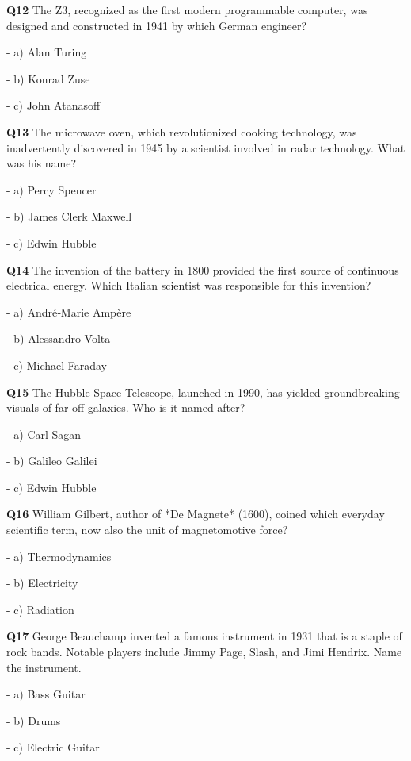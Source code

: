\textbf{Q12} The Z3, recognized as the first modern programmable computer, was designed and constructed in 1941 by which German engineer?\par
\quad - a) Alan Turing\par
\quad - b) Konrad Zuse\par
\quad - c) John Atanasoff\par

\textbf{Q13} The microwave oven, which revolutionized cooking technology, was inadvertently discovered in 1945 by a scientist involved in radar technology. What was his name?\par
\quad - a) Percy Spencer\par
\quad - b) James Clerk Maxwell\par
\quad - c) Edwin Hubble\par

\textbf{Q14} The invention of the battery in 1800 provided the first source of continuous electrical energy. Which Italian scientist was responsible for this invention?\par
\quad - a) André‑Marie Ampère\par
\quad - b) Alessandro Volta\par
\quad - c) Michael Faraday\par

\textbf{Q15} The Hubble Space Telescope, launched in 1990, has yielded groundbreaking visuals of far‑off galaxies. Who is it named after?\par
\quad - a) Carl Sagan\par
\quad - b) Galileo Galilei\par
\quad - c) Edwin Hubble\par

\textbf{Q16} William Gilbert, author of *De Magnete* (1600), coined which everyday scientific term, now also the unit of magnetomotive force?\par
\quad - a) Thermodynamics\par
\quad - b) Electricity\par
\quad - c) Radiation\par

\textbf{Q17} George Beauchamp invented a famous instrument in 1931 that is a staple of rock bands. Notable players include Jimmy Page, Slash, and Jimi Hendrix. Name the instrument.\par
\quad - a) Bass Guitar\par
\quad - b) Drums\par
\quad - c) Electric Guitar\par

